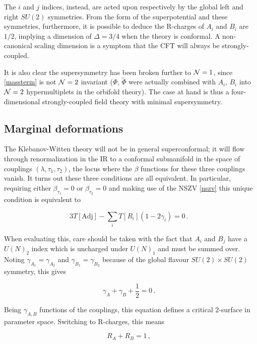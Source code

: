 The $i$ and $j$ indices, instead, are acted upon respectively by the global left and right $SU(2)$ symmetries. From the form of the superpotential and these symmetries, furthermore, it is possible to deduce the R-charges of $A_i$ and $B_i$ are $1/2$, implying a dimension of $\Delta = 3/4$ when the theory is conformal. A non-canonical scaling dimension is a symptom that the CFT will always be strongly-coupled.

It is also clear the supersymmetry has been broken further to $\mathcal{N} = 1$, since \eqref{massterm} is not $\mathcal{N} = 2$ invariant ($\Phi$, $\tilde \Phi$ were actually combined with $A_i$, $B_i$ into $\mathcal{N} = 2$ hypermultiplets in the orbifold theory). The case at hand is thus a four-dimensional strongly-coupled field theory with minimal supersymmetry.

\subsection{Marginal deformations}

The Klebanov-Witten theory will not be in general superconformal; it will flow through renormalization in the IR to a conformal submanifold in the space of couplings $(\lambda,\tau_1,\tau_2)$, the locus where the $\beta$ functions for these three couplings vanish. It turns out these three conditions are all equivalent. In particular, requiring either $\beta_{\tau_1} = 0$ or $\beta_{\tau_2} = 0$ and making use of the NSZV \eqref{nszv} this unique condition is equivalent to

\begin{equation}
	3 T[\mathrm{Adj}] - \sum_i T[R_i] ( 1- 2\gamma_i) = 0\,.
	\label{}
\end{equation}

When evaluating this, care should be taken with the fact that $A_i$ and $B_j$ have a $U(N)_2$ index which is uncharged under $U(N)_1$ and must be summed over. Noting $\gamma_{A_1} = \gamma_{A_2}$ and $\gamma_{B_1} = \gamma_{B_2}$ because of the global flavour $SU(2)\times SU(2)$ symmetry, this gives

\begin{equation}
	\gamma_A + \gamma_B + \frac{1}{2} = 0\,.
	\label{}
\end{equation}

Being $\gamma_{A,B}$ functions of the couplings, this equation defines a critical 2-surface in parameter space. Switching to R-charges, this means

\begin{equation}
	R_A + R_B = 1\,,
	\label{}
\end{equation}


